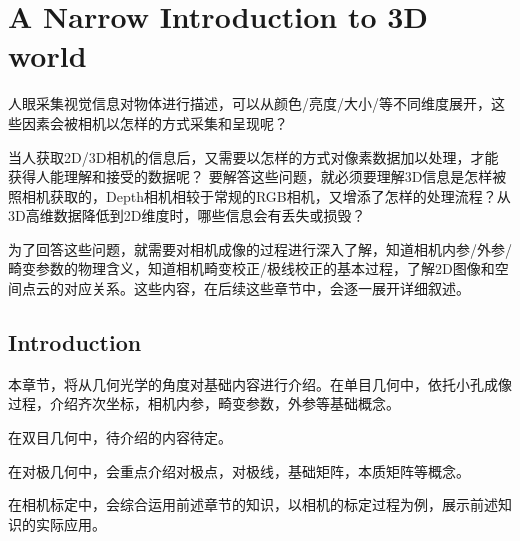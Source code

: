  

\chapter[Preface]{A Narrow Introduction to 3D world}
人眼采集视觉信息对物体进行描述，可以从颜色/亮度/大小/等不同维度展开，这些因素会被相机以怎样的方式采集和呈现呢？\par
当人获取2D/3D相机的信息后，又需要以怎样的方式对像素数据加以处理，才能获得人能理解和接受的数据呢？
要解答这些问题，就必须要理解3D信息是怎样被照相机获取的，Depth相机相较于常规的RGB相机，又增添了怎样的处理流程？从3D高维数据降低到2D维度时，哪些信息会有丢失或损毁？\par
为了回答这些问题，就需要对相机成像的过程进行深入了解，知道相机内参/外参/畸变参数的物理含义，知道相机畸变校正/极线校正的基本过程，了解2D图像和空间点云的对应关系。这些内容，在后续这些章节中，会逐一展开详细叙述。

\section{Introduction}
本章节，将从几何光学的角度对基础内容进行介绍。在单目几何中，依托小孔成像过程，介绍齐次坐标，相机内参，畸变参数，外参等基础概念。\par
在双目几何中，待介绍的内容待定。\par
在对极几何中，会重点介绍对极点，对极线，基础矩阵，本质矩阵等概念。\par
在相机标定中，会综合运用前述章节的知识，以相机的标定过程为例，展示前述知识的实际应用。
